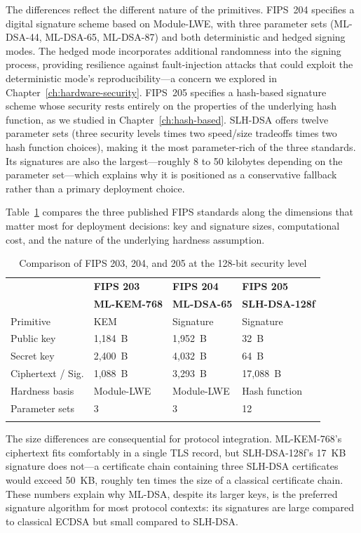 The differences reflect the different nature of the primitives. FIPS~204 specifies a digital signature scheme based on Module-LWE, with three parameter sets (ML-DSA-44, ML-DSA-65, ML-DSA-87) and both deterministic and hedged signing modes. The hedged mode incorporates additional randomness into the signing process, providing resilience against fault-injection attacks that could exploit the deterministic mode's reproducibility---a concern we explored in Chapter~\ref{ch:hardware-security}. FIPS~205 specifies a hash-based signature scheme whose security rests entirely on the properties of the underlying hash function, as we studied in Chapter~\ref{ch:hash-based}. SLH-DSA offers twelve parameter sets (three security levels times two speed/size tradeoffs times two hash function choices), making it the most parameter-rich of the three standards. Its signatures are also the largest---roughly 8 to 50 kilobytes depending on the parameter set---which explains why it is positioned as a conservative fallback rather than a primary deployment choice.

Table~\ref{tab:fips-comparison} compares the three published FIPS standards along the dimensions that matter most for deployment decisions: key and signature sizes, computational cost, and the nature of the underlying hardness assumption.

\begin{table}[t]
\caption{Comparison of FIPS 203, 204, and 205 at the 128-bit security level}
\label{tab:fips-comparison}
\begin{tabular}{p{2.8cm}p{2.5cm}p{2.5cm}p{3.5cm}}
\hline\noalign{\smallskip}
 & \textbf{FIPS 203} & \textbf{FIPS 204} & \textbf{FIPS 205} \\
 & \textbf{ML-KEM-768} & \textbf{ML-DSA-65} & \textbf{SLH-DSA-128f} \\
\noalign{\smallskip}\svhline\noalign{\smallskip}
Primitive & KEM & Signature & Signature \\
Public key & 1,184~B & 1,952~B & 32~B \\
Secret key & 2,400~B & 4,032~B & 64~B \\
Ciphertext / Sig. & 1,088~B & 3,293~B & 17,088~B \\
Hardness basis & Module-LWE & Module-LWE & Hash function \\
Parameter sets & 3 & 3 & 12 \\
\noalign{\smallskip}\hline
\end{tabular}
\end{table}

The size differences are consequential for protocol integration. ML-KEM-768's ciphertext fits comfortably in a single TLS record, but SLH-DSA-128f's 17~KB signature does not---a certificate chain containing three SLH-DSA certificates would exceed 50~KB, roughly ten times the size of a classical certificate chain. These numbers explain why ML-DSA, despite its larger keys, is the preferred signature algorithm for most protocol contexts: its signatures are large compared to classical ECDSA but small compared to SLH-DSA.

